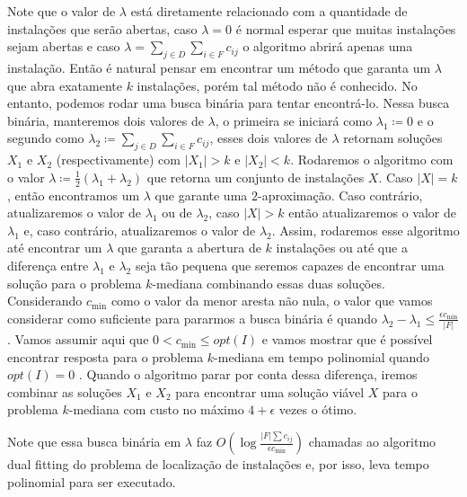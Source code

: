Note que o valor de $\lambda$ está diretamente relacionado com a quantidade de instalações que serão abertas, caso $\lambda = 0$ é normal esperar que muitas instalações sejam abertas e caso $\lambda = \sum_{j \in D}\sum_{i \in F}c_{ij}$ o algoritmo abrirá apenas uma instalação. Então é natural pensar em encontrar um método que garanta um $\lambda$ que abra exatamente $k$ instalações, porém tal método não é conhecido. No entanto, podemos rodar uma busca binária para tentar encontrá-lo. Nessa busca binária, manteremos dois valores de $\lambda$, o primeira se iniciará como $\lambda_1 \coloneqq 0$ e o segundo como $\lambda_2 \coloneqq \sum_{j \in D}\sum_{i \in F}c_{ij}$, esses dois valores de $\lambda$ retornam soluções $X_1$ e $X_2$ (respectivamente) com $|X_1| > k$ e $|X_2| < k$. Rodaremos o algoritmo com o valor $\lambda \coloneqq \frac{1}{2}\left(\lambda_1 + \lambda_2 \right)$ que retorna um conjunto de instalações $X$. Caso $|X| = k$, então encontramos um $\lambda$ que garante uma $2$-aproximação. Caso contrário, atualizaremos o valor de $\lambda_1$ ou de $\lambda_2$, caso $|X| > k$ então atualizaremos o valor de $\lambda_1$ e, caso contrário, atualizaremos o valor de $\lambda_2$. Assim, rodaremos esse algoritmo até encontrar um $\lambda$ que garanta a abertura de $k$ instalações ou até que a diferença entre $\lambda_1$ e $\lambda_2$ seja tão pequena que seremos capazes de encontrar uma solução para o problema $k$-mediana combinando essas duas soluções. Considerando $c_{\min}$ como o valor da menor aresta não nula, o valor que vamos considerar como suficiente para pararmos a busca binária é quando $\lambda_2 - \lambda_1 \leq \frac{\epsilon c_{\min}}{|F|}$. Vamos assumir aqui que $0 < c_{\min} \leq opt(I)$ e vamos mostrar que é possível encontrar resposta para o problema $k$-mediana em tempo polinomial quando $opt(I)=0$ . Quando o algoritmo parar por conta dessa diferença, iremos combinar as soluções $X_1$ e $X_2$ para encontrar uma solução viável $X$ para o problema $k$-mediana com custo no máximo $4 + \epsilon$ vezes o ótimo.

Note que essa busca binária em $\lambda$ faz $O(\log \frac{|F| \sum c_{ij}}{\epsilon c_{\min}})$ chamadas ao algoritmo dual fitting do problema de localização de instalações e, por isso, leva tempo polinomial para ser executado.

